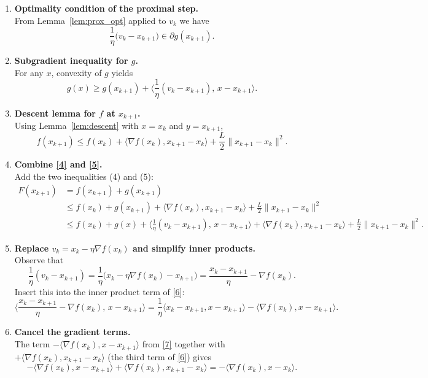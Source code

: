 \documentclass{article}
\newcommand{\grad}{\nabla}
\begin{document}
\begin{enumerate}[label=[Step \arabic*],leftmargin=*,itemsep=1ex]
\item \textbf{Optimality condition of the proximal step.}\\
From Lemma~\ref{lem:prox_opt} applied to $v_{k}$ we have
\[
\frac{1}{\eta}\bigl(v_{k}-x_{k+1}\bigr)\in\partial g(x_{k+1}).
\tag{3}
\]

\item \textbf{Subgradient inequality for $g$.}\\
For any $x$, convexity of $g$ yields
\[
g(x)\ge g(x_{k+1})+\Big\langle \frac{1}{\eta}(v_{k}-x_{k+1}),\,x-x_{k+1}\Big\rangle .
\tag{4}
\]

\item \textbf{Descent lemma for $f$ at $x_{k+1}$.}\\
Using Lemma~\ref{lem:descent} with $x=x_{k}$ and $y=x_{k+1}$,
\[
f(x_{k+1})\le f(x_{k})+\langle\grad f(x_{k}),x_{k+1}-x_{k}\rangle
+\frac{L}{2}\|x_{k+1}-x_{k}\|^{2}.
\tag{5}
\]

\item \textbf{Combine \eqref{4} and \eqref{5}.}\\
Add the two inequalities (4) and (5):
\[
\begin{aligned}
F(x_{k+1}) 
&= f(x_{k+1})+g(x_{k+1})\\
&\le f(x_{k})+g(x_{k+1})
+\langle\grad f(x_{k}),x_{k+1}-x_{k}\rangle
+\frac{L}{2}\|x_{k+1}-x_{k}\|^{2}\\
&\le f(x_{k})+g(x)
+\Big\langle \frac{1}{\eta}(v_{k}-x_{k+1}),\,x-x_{k+1}\Big\rangle
+\langle\grad f(x_{k}),x_{k+1}-x_{k}\rangle
+\frac{L}{2}\|x_{k+1}-x_{k}\|^{2}.
\end{aligned}
\tag{6}
\]

\item \textbf{Replace $v_{k}=x_{k}-\eta\grad f(x_{k})$ and simplify inner products.}\\
Observe that
\[
\frac{1}{\eta}(v_{k}-x_{k+1})
= \frac{1}{\eta}\bigl(x_{k}-\eta\grad f(x_{k})-x_{k+1}\bigr)
= \frac{x_{k}-x_{k+1}}{\eta}-\grad f(x_{k}).
\]
Insert this into the inner product term of \eqref{6}:
\[
\Big\langle \frac{x_{k}-x_{k+1}}{\eta}-\grad f(x_{k}),\,x-x_{k+1}\Big\rangle
= \frac{1}{\eta}\langle x_{k}-x_{k+1},x-x_{k+1}\rangle
-\langle\grad f(x_{k}),x-x_{k+1}\rangle .
\tag{7}
\]

\item \textbf{Cancel the gradient terms.}\\
The term $-\langle\grad f(x_{k}),x-x_{k+1}\rangle$ from \eqref{7} together with $+\langle\grad f(x_{k}),x_{k+1}-x_{k}\rangle$ (the third term of \eqref{6}) gives
\[
-\langle\grad f(x_{k}),x-x_{k+1}\rangle
+\langle\grad f(x_{k}),x_{k+1}-x_{k}\rangle
= -\langle\grad f(x_{k}),x-x_{k}\rangle .
\tag{8}
\]


\end{enumerate}
\end{document}
